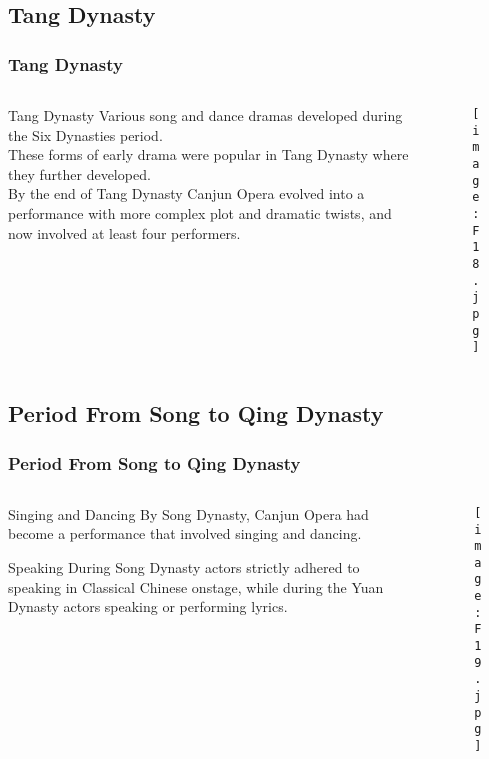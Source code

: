 \documentclass[pdflatex,compress,8pt,
	xcolor={dvipsnames,dvipsnames,svgnames,x11names,table},
	hyperref={	
	breaklinks = true, 
	pdfauthor={Lemenkova Polina}, 
	pdfsubject={Preentation}, 
	pdfcreator={Lemenkova Polina}, 
	pdfproducer={Lemenkova Polina}, 
	colorlinks=true,
	linkcolor=NavyBlue, 
	citecolor=NavyBlue, 
	urlcolor = NavyBlue, 
	breaklinks = true}]{beamer}
\begin{document}
\subsection{Tang Dynasty}
\begin{frame}\frametitle{Tang Dynasty}
	\begin{minipage}[0.4\textheight]{\textwidth}
		\begin{columns}[T]
			\begin{column}{0.5\textwidth}
	\begin{alertblock}{Tang Dynasty}
Various song and dance dramas developed during the Six Dynasties period. \\
These forms of early drama were popular in Tang Dynasty where they further developed. \\
By the end of Tang Dynasty Canjun Opera evolved into a performance with more complex plot and dramatic twists, and now involved at least \alert{four} performers.
	\end{alertblock}
			\end{column}
			\begin{column}{0.5\textwidth}
				\begin{figure}[H]
					\centering
						\texttt{[image: F18.jpg]}
				\end{figure}
			\end{column}
		\end{columns}
	\end{minipage}
\end{frame}


\subsection{Period From Song to Qing Dynasty}
\begin{frame}\frametitle{Period From Song to Qing Dynasty}

	\begin{minipage}[0.4\textheight]{\textwidth}
		\begin{columns}[T]
			\begin{column}{0.5\textwidth}
	\begin{alertblock}{Singing and Dancing}
By Song Dynasty, Canjun Opera had become a performance that involved \alert{singing} and \alert{dancing}.
	\end{alertblock}

	\begin{block}{Speaking}
	During Song Dynasty actors strictly adhered to speaking in Classical Chinese onstage, while during the Yuan Dynasty actors speaking or performing lyrics.
	\end{block}
			\end{column}
			\begin{column}{0.5\textwidth}
				\begin{figure}[H]
					\centering
						\texttt{[image: F19.jpg]}
				\end{figure}
			\end{column}
		\end{columns}
	\end{minipage}
\end{frame}
\end{document}
